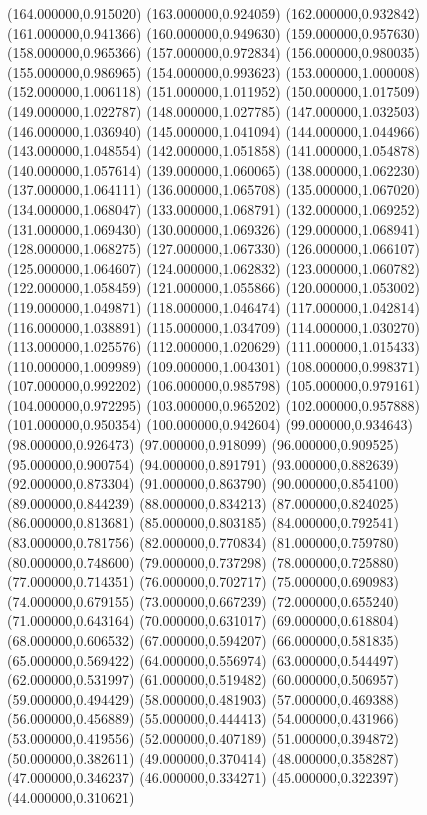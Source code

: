 {(164.000000,0.915020)
(163.000000,0.924059)
(162.000000,0.932842)
(161.000000,0.941366)
(160.000000,0.949630)
(159.000000,0.957630)
(158.000000,0.965366)
(157.000000,0.972834)
(156.000000,0.980035)
(155.000000,0.986965)
(154.000000,0.993623)
(153.000000,1.000008)
(152.000000,1.006118)
(151.000000,1.011952)
(150.000000,1.017509)
(149.000000,1.022787)
(148.000000,1.027785)
(147.000000,1.032503)
(146.000000,1.036940)
(145.000000,1.041094)
(144.000000,1.044966)
(143.000000,1.048554)
(142.000000,1.051858)
(141.000000,1.054878)
(140.000000,1.057614)
(139.000000,1.060065)
(138.000000,1.062230)
(137.000000,1.064111)
(136.000000,1.065708)
(135.000000,1.067020)
(134.000000,1.068047)
(133.000000,1.068791)
(132.000000,1.069252)
(131.000000,1.069430)
(130.000000,1.069326)
(129.000000,1.068941)
(128.000000,1.068275)
(127.000000,1.067330)
(126.000000,1.066107)
(125.000000,1.064607)
(124.000000,1.062832)
(123.000000,1.060782)
(122.000000,1.058459)
(121.000000,1.055866)
(120.000000,1.053002)
(119.000000,1.049871)
(118.000000,1.046474)
(117.000000,1.042814)
(116.000000,1.038891)
(115.000000,1.034709)
(114.000000,1.030270)
(113.000000,1.025576)
(112.000000,1.020629)
(111.000000,1.015433)
(110.000000,1.009989)
(109.000000,1.004301)
(108.000000,0.998371)
(107.000000,0.992202)
(106.000000,0.985798)
(105.000000,0.979161)
(104.000000,0.972295)
(103.000000,0.965202)
(102.000000,0.957888)
(101.000000,0.950354)
(100.000000,0.942604)
(99.000000,0.934643)
(98.000000,0.926473)
(97.000000,0.918099)
(96.000000,0.909525)
(95.000000,0.900754)
(94.000000,0.891791)
(93.000000,0.882639)
(92.000000,0.873304)
(91.000000,0.863790)
(90.000000,0.854100)
(89.000000,0.844239)
(88.000000,0.834213)
(87.000000,0.824025)
(86.000000,0.813681)
(85.000000,0.803185)
(84.000000,0.792541)
(83.000000,0.781756)
(82.000000,0.770834)
(81.000000,0.759780)
(80.000000,0.748600)
(79.000000,0.737298)
(78.000000,0.725880)
(77.000000,0.714351)
(76.000000,0.702717)
(75.000000,0.690983)
(74.000000,0.679155)
(73.000000,0.667239)
(72.000000,0.655240)
(71.000000,0.643164)
(70.000000,0.631017)
(69.000000,0.618804)
(68.000000,0.606532)
(67.000000,0.594207)
(66.000000,0.581835)
(65.000000,0.569422)
(64.000000,0.556974)
(63.000000,0.544497)
(62.000000,0.531997)
(61.000000,0.519482)
(60.000000,0.506957)
(59.000000,0.494429)
(58.000000,0.481903)
(57.000000,0.469388)
(56.000000,0.456889)
(55.000000,0.444413)
(54.000000,0.431966)
(53.000000,0.419556)
(52.000000,0.407189)
(51.000000,0.394872)
(50.000000,0.382611)
(49.000000,0.370414)
(48.000000,0.358287)
(47.000000,0.346237)
(46.000000,0.334271)
(45.000000,0.322397)
(44.000000,0.310621)
}
